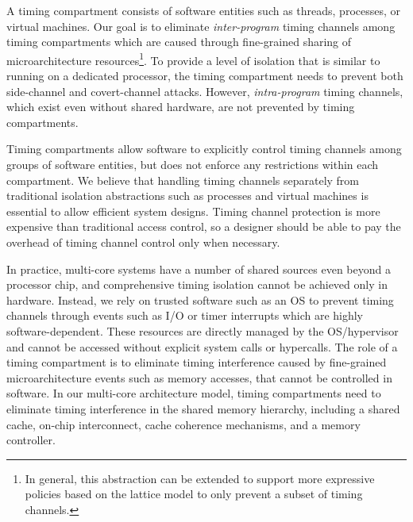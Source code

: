 A timing compartment consists of  
software entities such as threads, processes, or virtual machines.
Our goal is to eliminate {\em inter-program} timing
channels among timing compartments which are caused through fine-grained sharing of microarchitecture 
resources\footnote{In general, this abstraction can be extended to support
more expressive policies based on the lattice model \cite{denning} to only prevent
a subset of timing channels.}.
To provide a level of isolation that is similar to running on a dedicated processor,
the timing compartment needs to prevent both side-channel and covert-channel attacks.
However, {\em intra-program} timing channels,
which exist even without shared hardware, are not prevented by
timing compartments. 

Timing compartments allow software to explicitly control timing channels
among groups of software entities, but does not enforce any restrictions within
each compartment. We believe that handling timing channels separately from
traditional isolation abstractions such as processes and virtual machines is 
essential to allow efficient system designs. Timing channel protection
is more expensive than traditional access control, so a designer should be able
to pay the overhead of timing channel control only when necessary.

In practice, multi-core systems have a number of shared sources even beyond a
processor chip, and comprehensive timing isolation cannot be achieved only in hardware.
Instead, we rely on trusted software such as an OS to prevent timing channels 
through events such as I/O or timer interrupts which are highly 
software-dependent.
These resources are directly managed by the OS/hypervisor and cannot be accessed 
without explicit system calls or hypercalls.
The role of a timing compartment is to eliminate
timing interference caused by fine-grained microarchitecture events such as memory accesses,
that cannot be controlled in software.
In our multi-core architecture model, timing compartments need to eliminate
timing interference in the shared memory hierarchy, including a shared cache,
on-chip interconnect, cache coherence mechanisms, and a memory controller.


